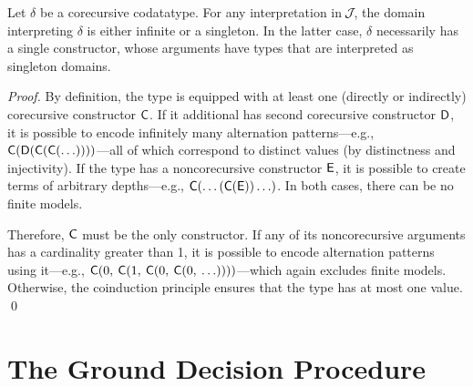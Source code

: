 \begin{lemma}%
\label{lem:corecursive-singletons}%
\afterDot
Let $\delta$ be a corecursive codatatype. For any interpretation in $\mathcal{\!J\!}$,
the domain interpreting $\delta$ is either infinite or a singleton. In the
latter case, $\delta$ necessarily has a single constructor, whose arguments have
types that are interpreted as singleton domains.
\end{lemma}

\begin{rep}
\begin{proof}
By definition, the type is equipped with at least one (directly or indirectly)
corecursive constructor $\textsf{C}$. If it additional has second
corecursive constructor $\textsf{D}$, it is possible to encode infinitely many
alternation patterns---e.g.,
$\textsf{C}(\textsf{D}(\textsf{C}(\textsf{C}(\ldots))))$---all of which correspond
to distinct values (by distinctness and injectivity). If the type has a
noncorecursive constructor $\textsf{E}$, it is possible to create terms of
arbitrary depths---e.g., $\textsf{C}(\ldots(\textsf{C}(\textsf{E}))\ldots)$. In
both cases, there can be no finite models.

Therefore, $\textsf{C}$ must be the only constructor.
If any of its noncorecursive arguments has a cardinality greater than 1,
it is possible to encode alternation patterns using it---e.g.,
$\textsf{C}(0,\: \textsf{C}(1,\: \textsf{C}(0,\: \textsf{C}(0,\: \ldots))))$---which
again excludes finite models. Otherwise, the coinduction principle ensures
that the type has at most one value.
\qed
\end{proof}
\end{rep}


\section{The Ground Decision Procedure} %
\label{sec:the-ground-decision-procedure}

